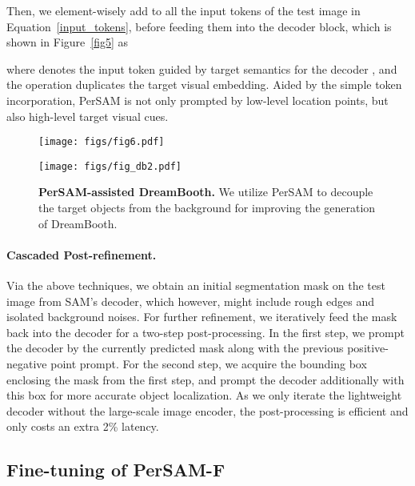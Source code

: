 \documentclass{article} \usepackage{iclr2024_conference,times}
\makeatletter
\newcommand\figcaption{\def\@captype{figure}\caption}
\makeatother
\begin{document}
Then, we element-wisely add  to all the input tokens of the test image in Equation~\ref{input_tokens}, before feeding them into the decoder block, which is shown in Figure~\ref{fig5} as

where  denotes the input token guided by target semantics for the decoder , and the  operation duplicates the target visual embedding.
Aided by the simple token incorporation, PerSAM is not only prompted by low-level location points, but also high-level target visual cues.

\begin{figure*}[t!]
\vspace{-0.2cm}
\begin{minipage}[t]{0.45\textwidth}
\texttt{[image: figs/fig6.pdf]}
\figcaption{\textbf{The Scale-aware Fine-tuning in PerSAM-F.} To alleviate the scale ambiguity, PerSAM-F adopts two learnable weights for adaptively aggregating three-scale masks.}
\label{fig6}
\end{minipage}
\hspace{0.27in}
\begin{minipage}[t]{0.45\textwidth}
\texttt{[image: figs/fig\_db2.pdf]}
\figcaption{\textbf{PerSAM-assisted DreamBooth.} We utilize PerSAM to decouple the target objects from the background for improving the generation of DreamBooth.}
\label{fig_db2}
\end{minipage}
\end{figure*}

\paragraph{Cascaded Post-refinement.}
Via the above techniques, we obtain an initial segmentation mask on the test image from SAM's decoder, which however, might include rough edges and isolated background noises. For further refinement, we iteratively feed the mask back into the decoder  for a two-step post-processing.
In the first step, we prompt the decoder by the currently predicted mask along with the previous positive-negative point prompt. For the second step, we acquire the bounding box enclosing the mask from the first step, and prompt the decoder additionally with this box for more accurate object localization.
As we only iterate the lightweight decoder without the large-scale image encoder, the post-processing is efficient and only costs an extra 2\% latency.


\subsection{Fine-tuning of PerSAM-F}
\label{s3.3}
\end{document}
